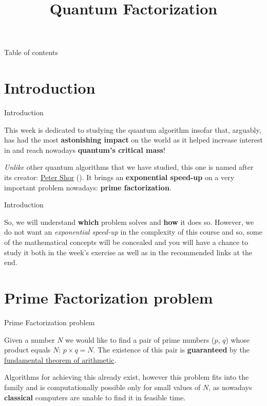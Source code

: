 \documentclass[aspectratio=43]{beamer}
\title{Quantum Factorization}
\begin{document}
\begin{frame}
	\titlepage
\end{frame}


\begin{frame}{Table of contents}
	\begin{card}
		\tableofcontents
	\end{card}
\end{frame}


\section{Introduction}
\begin{frame}{Introduction}
    \begin{card}
        This week is dedicated to studying the quantum algorithm insofar that, arguably, has had the most \textbf{astonishing impact} on the world as it helped increase interest in \qc and reach nowadays \textbf{quantum's critical mass}!
    \end{card}
    \begin{card}
        \textit{Unlike} other quantum algorithms that we have studied, this one is named after its creator: \href{https://en.wikipedia.org/wiki/Peter_Shor}{Peter Shor} (\textbf{\sa}). It brings an \textbf{exponential speed-up} on a very important problem nowadays: \textbf{prime factorization}.
    \end{card}
\pagenumber
\end{frame}
\begin{frame}{Introduction}
    \begin{card}
        So, we will understand \textbf{which} problem \sa solves and \textbf{how} it does so. However, we do not want an \textit{exponential speed-up} in the complexity of this course and so, some of the mathematical concepts will be concealed and you will have a chance to study it both in the week's exercise as well as in the recommended links at the end.
    \end{card}
\pagenumber
\end{frame}


\section{Prime Factorization problem}
\begin{frame}{Prime Factorization problem}
    \begin{card}
        Given a number $N$ we would like to find a pair of prime numbers ($p$, $q$) whose product equals $N$: $p\times q=N$. The existence of this pair is \textbf{guaranteed} by the \href{https://en.wikipedia.org/wiki/Fundamental_theorem_of_arithmetic}{fundamental theorem of arithmetic}.
    \end{card}
    \begin{card}
        Algorithms for achieving this already exist, however this problem fits into the \np family and is computationally possible only for small values of $N$, as nowadays \textbf{classical} computers are unable to find it in feasible time.
    \end{card}
\pagenumber
\end{frame}
\end{document}
